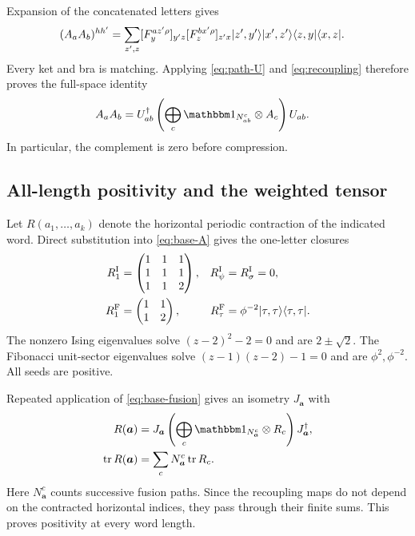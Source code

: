 Expansion of the concatenated letters gives
\begin{align}
	(A_aA_b)^{hh'}
	 & =\sum_{z',z}
	    [F^{a z'\rho}_y]_{y'z}
	    [F^{b x'\rho}_z]_{z'x}
	\lvert z',y'\rangle\lvert x',z'\rangle
	\langle z,y\rvert\langle x,z\rvert.
\end{align}
Every ket and bra is matching. Applying \cref{eq:path-U} and
\cref{eq:recoupling} therefore proves the full-space identity
\begin{align}
	A_aA_b
	 & =U_{ab}^\dagger
	\left(\bigoplus_c\Id_{N_{ab}^c}\otimes A_c\right)U_{ab}.
	\label{eq:base-fusion}
\end{align}
In particular, the complement is zero before compression.

\subsection{All-length positivity and the weighted tensor}

Let $R(a_1,\ldots,a_k)$ denote the horizontal periodic contraction
of the indicated word. Direct substitution into \cref{eq:base-A}
gives the one-letter closures
\begin{align}
	R_1^{\mathrm I}
	                   & =\begin{pmatrix}1&1&1\\1&1&1\\1&1&2\end{pmatrix}, &
	R_\psi^{\mathrm I} & =R_\sigma^{\mathrm I}=0,                            \\
	R_1^{\mathrm F}
	                   & =\begin{pmatrix}1&1\\1&2\end{pmatrix},            &
	R_\tau^{\mathrm F}
	                   & =\phi^{-2}\lvert\tau,\tau\rangle\langle\tau,\tau\rvert.
	\label{eq:seeds}
\end{align}
The nonzero Ising eigenvalues solve $(z-2)^2-2=0$ and are
$2\pm\sqrt2$. The Fibonacci unit-sector eigenvalues solve
$(z-1)(z-2)-1=0$ and are $\phi^2,\phi^{-2}$. All seeds are
positive.

Repeated application of \cref{eq:base-fusion} gives an isometry
$J_{\boldsymbol a}$ with
\begin{align}
	R(\boldsymbol a)
	 & =J_{\boldsymbol a}
	\left(\bigoplus_c\Id_{N_{\boldsymbol a}^c}\otimes R_c\right)
	J_{\boldsymbol a}^\dagger,            \\
	\tr R(\boldsymbol a)
	 & =\sum_cN_{\boldsymbol a}^c\tr R_c.
	\label{eq:word-spectrum}
\end{align}
Here $N_{\boldsymbol a}^c$ counts successive fusion paths. Since
the recoupling maps do not depend on the contracted horizontal
indices, they pass through their finite sums. This proves positivity
at every word length.

